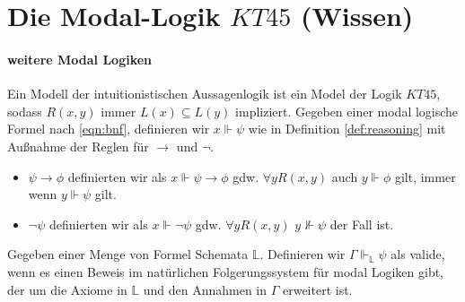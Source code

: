 

\section{Die Modal-Logik $KT45$ (Wissen)} %
\label{sub:the_normal_modal_logic_s5_}


\paragraph{weitere Modal Logiken} %
\label{par:weitere_modal_logiken}


\begin{definition}
	Ein Modell der intuitionistischen Aussagenlogik ist ein Model \modelFormel der Logik $KT45$, sodass $R(x,y)$ immer $L(x) \subseteq L(y)$ impliziert.
	Gegeben einer modal logische Formel nach \eqref{eqn:bnf}, definieren wir $x \Vdash \psi$ wie in Definition \eqref{def:reasoning} mit Außnahme der Reglen für $\rightarrow$ und $\neg$.
	\begin{itemize}
		\item $\psi \rightarrow \phi$ definierten wir als $x \Vdash \psi \rightarrow \phi$ gdw. $\forall y R(x,y)$ auch $y \Vdash \phi$ gilt, immer wenn $y \Vdash \psi$ gilt.
		\item $\neg \psi$ definierten wir als $x \Vdash \neg \psi$ gdw. $\forall y R(x,y)$ $y \nVdash \psi$ der Fall ist.
	\end{itemize}
\end{definition}
\cite[S.328]{huth2004logic}

\begin{definition}
	Gegeben einer Menge von Formel Schemata $\mathds{L}$.
	Definieren wir $\Gamma \Vdash_\mathds{L} \psi$ als valide, wenn es einen Beweis im natürlichen Folgerungssystem für modal Logiken gibt, der um die Axiome in $\mathds{L}$ und den Annahmen in $\Gamma$ erweitert ist.
\end{definition}
\cite[S.330]{huth2004logic}

